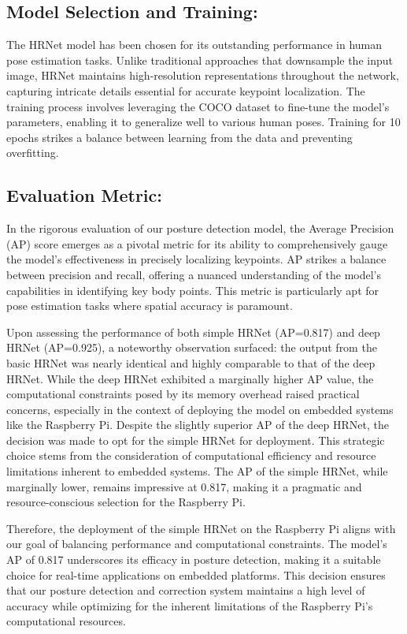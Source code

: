 \documentclass{article}
\begin{document}
\subsection{Model Selection and Training:}
The HRNet model has been chosen for its outstanding performance in human pose estimation tasks. Unlike traditional approaches that downsample the input image, HRNet maintains high-resolution representations throughout the network, capturing intricate details essential for accurate keypoint localization. The training process involves leveraging the COCO dataset to fine-tune the model's parameters, enabling it to generalize well to various human poses. Training for 10 epochs strikes a balance between learning from the data and preventing overfitting.

\subsection{Evaluation Metric:}
In the rigorous evaluation of our posture detection model, the Average Precision (AP) score emerges as a pivotal metric for its ability to comprehensively gauge the model's effectiveness in precisely localizing keypoints. AP strikes a balance between precision and recall, offering a nuanced understanding of the model's capabilities in identifying key body points. This metric is particularly apt for pose estimation tasks where spatial accuracy is paramount.

Upon assessing the performance of both simple HRNet (AP=0.817) and deep HRNet (AP=0.925), a noteworthy observation surfaced: the output from the basic HRNet was nearly identical and highly comparable to that of the deep HRNet. While the deep HRNet exhibited a marginally higher AP value, the computational constraints posed by its memory overhead raised practical concerns, especially in the context of deploying the model on embedded systems like the Raspberry Pi. Despite the slightly superior AP of the deep HRNet, the decision was made to opt for the simple HRNet for deployment. This strategic choice stems from the consideration of computational efficiency and resource limitations inherent to embedded systems. The AP of the simple HRNet, while marginally lower, remains impressive at 0.817, making it a pragmatic and resource-conscious selection for the Raspberry Pi.

Therefore, the deployment of the simple HRNet on the Raspberry Pi aligns with our goal of balancing performance and computational constraints. The model's AP of 0.817 underscores its efficacy in posture detection, making it a suitable choice for real-time applications on embedded platforms. This decision ensures that our posture detection and correction system maintains a high level of accuracy while optimizing for the inherent limitations of the Raspberry Pi's computational resources.
\end{document}
